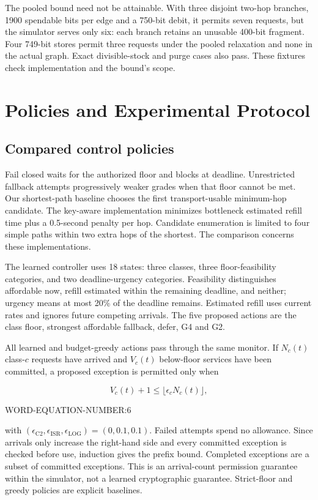 \documentclass[conference,a4paper]{IEEEtran}
\begin{document}
The pooled bound need not be attainable. With three disjoint two-hop branches, 1900 spendable bits per edge and a 750-bit debit, it permits seven requests, but the simulator serves only six: each branch retains an unusable 400-bit fragment. Four 749-bit stores permit three requests under the pooled relaxation and none in the actual graph. Exact divisible-stock and purge cases also pass. These fixtures check implementation and the bound's scope.

\section{Policies and Experimental Protocol}\label{sec:protocol}
\subsection{Compared control policies}
Fail closed waits for the authorized floor and blocks at deadline. Unrestricted fallback attempts progressively weaker grades when that floor cannot be met. Our shortest-path baseline chooses the first transport-usable minimum-hop candidate. The key-aware implementation minimizes bottleneck estimated refill time plus a 0.5-second penalty per hop. Candidate enumeration is limited to four simple paths within two extra hops of the shortest. The comparison concerns these implementations.

The learned controller uses 18 states: three classes, three floor-feasibility categories, and two deadline-urgency categories. Feasibility distinguishes affordable now, refill estimated within the remaining deadline, and neither; urgency means at most 20\% of the deadline remains. Estimated refill uses current rates and ignores future competing arrivals. The five proposed actions are the class floor, strongest affordable fallback, defer, G4 and G2.

All learned and budget-greedy actions pass through the same monitor. If $N_c(t)$ class-$c$ requests have arrived and $V_c(t)$ below-floor services have been committed, a proposed exception is permitted only when


\[
V_c(t)+1\leq\lfloor\epsilon_cN_c(t)\rfloor,
\]

WORD-EQUATION-NUMBER:6


with $(\epsilon_{\mathrm{C2}},\epsilon_{\mathrm{ISR}},\epsilon_{\mathrm{LOG}})=(0,0.1,0.1)$. Failed attempts spend no allowance. Since arrivals only increase the right-hand side and every committed exception is checked before use, induction gives the prefix bound. Completed exceptions are a subset of committed exceptions. This is an arrival-count permission guarantee within the simulator, not a learned cryptographic guarantee. Strict-floor and greedy policies are explicit baselines.
\end{document}
